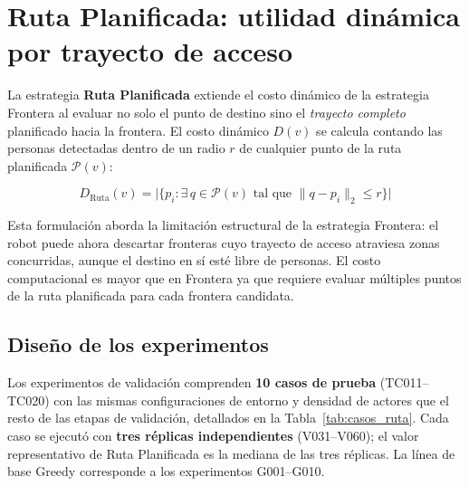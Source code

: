 \section{Ruta Planificada: utilidad dinámica por trayecto de acceso}%
\label{sec:exp_e2}

La estrategia \textbf{Ruta Planificada} extiende el costo dinámico de la estrategia Frontera al evaluar no solo el punto de destino sino el \emph{trayecto completo} planificado hacia la frontera. El costo dinámico $D(v)$ se calcula contando las personas detectadas dentro de un radio $r$ de cualquier punto de la ruta planificada $\mathcal{P}(v)$:

\begin{equation}
    D_{\text{Ruta}}(v) = \bigl|\{ p_i : \exists\, q \in \mathcal{P}(v) \text{ tal que } \|q - p_i\|_2 \leq r \}\bigr|
\end{equation}

\noindent Esta formulación aborda la limitación estructural de la estrategia Frontera: el robot puede ahora descartar fronteras cuyo trayecto de acceso atraviesa zonas concurridas, aunque el destino en sí esté libre de personas. El costo computacional es mayor que en Frontera ya que requiere evaluar múltiples puntos de la ruta planificada para cada frontera candidata.

\subsection{Diseño de los experimentos}

Los experimentos de validación comprenden \textbf{10 casos de prueba} (TC011–TC020) con las mismas configuraciones de entorno y densidad de actores que el resto de las etapas de validación, detallados en la Tabla~\ref{tab:casos_ruta}. Cada caso se ejecutó con \textbf{tres réplicas independientes} (V031–V060); el valor representativo de Ruta Planificada es la mediana de las tres réplicas. La línea de base Greedy corresponde a los experimentos G001–G010.

